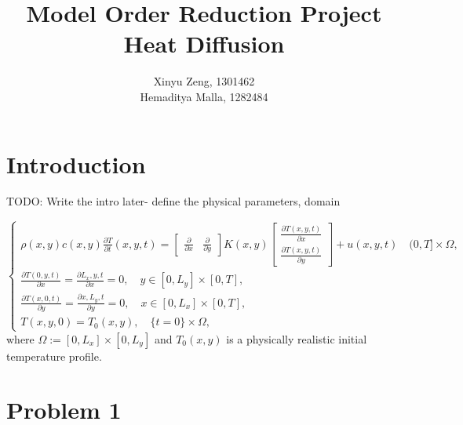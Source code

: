 \documentclass[12pt]{article}
\newcommand{\TODO}[1]{{\color{red} TODO: #1}}
\newcommand{\parder}[2]{\frac{\partial #1}{\partial #2}}
\begin{document}
 
 
\title{%
  Model Order Reduction Project \\
  \large Heat Diffusion} 
 
 \author{ %
Xinyu Zeng, 1301462 \\
Hemaditya Malla, 1282484
}
 
\maketitle
\tableofcontents
\pagebreak
\section*{Introduction}
\TODO{Write the intro later- define the physical parameters, domain}

\begin{equation}
 \begin{cases}
    \rho(x,y)c(x,y)\parder{T}{t}(x,y,t) = \begin{bmatrix}\parder{ }{x} & \parder{ }{y}\end{bmatrix}K(x,y)\begin{bmatrix}\parder{T(x,y,t)}{x} \\ \parder{T(x,y,t)}{y}\end{bmatrix} + u(x,y,t) \quad (0, T] \times \Omega, \\
    \parder{T(0,y,t)}{x} = \parder{L_x,y,t}{x} = 0, \quad y\in[0,L_y] \times [0,T],   \\
    \parder{T(x,0,t)}{y} = \parder{x,L_y,t}{y} = 0, \quad x\in[0,L_x] \times [0,T],   \\
    T(x,y,0) = T_0(x,y), \quad \{t = 0\} \times \Omega,
\end{cases}
\end{equation}
where $\Omega := [0,L_x] \times [0,L_y]$ and $T_0(x,y)$ is a physically realistic initial temperature profile.
\section*{Problem 1}
\end{document}

